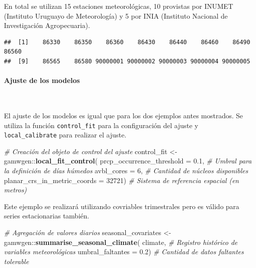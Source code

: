 \documentclass[
  12pt]{article}
\newenvironment{Shaded}{}{}
\newcommand{\CommentTok}[1]{\textcolor[rgb]{0.38,0.63,0.69}{\textit{#1}}}
\newcommand{\DataTypeTok}[1]{\textcolor[rgb]{0.56,0.13,0.00}{#1}}
\newcommand{\DecValTok}[1]{\textcolor[rgb]{0.25,0.63,0.44}{#1}}
\newcommand{\FloatTok}[1]{\textcolor[rgb]{0.25,0.63,0.44}{#1}}
\newcommand{\KeywordTok}[1]{\textcolor[rgb]{0.00,0.44,0.13}{\textbf{#1}}}
\newcommand{\NormalTok}[1]{#1}
\newcommand{\OperatorTok}[1]{\textcolor[rgb]{0.40,0.40,0.40}{#1}}
\newcommand{\StringTok}[1]{\textcolor[rgb]{0.25,0.44,0.63}{#1}}
\begin{document}
En total se utilizan 15 estaciones meteorológicas, 10 provistas por INUMET (Instituto Uruguayo de Meteorología) y 5 por INIA (Instituto Nacional de Investigación Agropecuaria).

\begin{Shaded}
\end{Shaded}

\begin{verbatim}
##  [1]    86330    86350    86360    86430    86440    86460    86490    86560
##  [9]    86565    86580 90000001 90000002 90000003 90000004 90000005
\end{verbatim}

\hypertarget{ajuste-de-los-modelos-2}{%
\paragraph{Ajuste de los modelos}\label{ajuste-de-los-modelos-2}}

~

El ajuste de los modelos es igual que para los dos ejemplos antes mostrados. Se utiliza la función \texttt{control\_fit} para la configuración del ajuste y \texttt{local\_calibrate} para realizar el ajuste.

\begin{Shaded}
\begin{Highlighting}[]
\CommentTok{# Creación del objeto de control del ajuste}
\NormalTok{control_fit <-gamwgen}\OperatorTok{::}\KeywordTok{local_fit_control}\NormalTok{(}
  \DataTypeTok{prcp_occurrence_threshold =} \FloatTok{0.1}\NormalTok{, }
  \CommentTok{# Umbral para la definición de días húmedos}
  \DataTypeTok{avbl_cores =} \DecValTok{6}\NormalTok{, }
  \CommentTok{# Cantidad de núcleos disponibles}
  \DataTypeTok{planar_crs_in_metric_coords =} \DecValTok{32721}\NormalTok{) }
  \CommentTok{# Sistema de referencia espacial (en metros)}
\end{Highlighting}
\end{Shaded}

Este ejemplo se realizará utilizando covriables trimestrales pero es válido para series estacionarias también.

\begin{Shaded}
\begin{Highlighting}[]
\CommentTok{# Agregación de valores diarios }
\NormalTok{seasonal_covariates <-}\StringTok{ }\NormalTok{gamwgen}\OperatorTok{::}\KeywordTok{summarise_seasonal_climate}\NormalTok{(}
\NormalTok{  climate, }
  \CommentTok{# Registro histórico de variables meteorológicas}
  \DataTypeTok{umbral_faltantes =} \FloatTok{0.2}\NormalTok{)}
  \CommentTok{# Cantidad de datos faltantes tolerable}
\end{Highlighting}
\end{Shaded}
\end{document}
